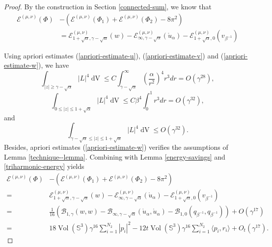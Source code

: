 \documentclass[11pt,letterpaper]{amsart}
\DeclareMathOperator{\Vol}{Vol}
\DeclareMathOperator{\dvol}{dV}
\newcommand{\mB}{\mathcal{B}}
\newcommand{\mE}{\mathcal{E}}
\newcommand{\bS}{\mathbb{S}}
\theoremstyle{definition}
\theoremstyle{remark}
\numberwithin{equation}{section}
\begin{document}
\begin{proof}
By the construction in Section \ref{connected-sum}, we know that
\begin{equation}
\begin{split}
    \mE^{(\mu,\nu)}(\Phi)&-\left(\mE^{(\mu,\nu)}(\Phi_1)+\mE^{(\mu,\nu)}(\Phi_2)-8\pi^2\right)\\
    &=\mE^{(\mu,\nu)}_{1+\sqrt{\alpha},\gamma-\sqrt{\alpha}}(w)-\mE^{(\mu,\nu)}_{\infty,\gamma-\sqrt{\alpha}}(\mathring{u}_{\alpha})-\mE^{(\mu,\nu)}_{1+\sqrt{\alpha},0}(v_{\beta^{-1}})
    \end{split}
\end{equation}

Using apriori estimates (\ref{apriori-estimate-u}), (\ref{apriori-estimate-v}) and (\ref{apriori-estimate-w}), we have
    \begin{equation}
    \int_{|z|\geq \gamma-\sqrt{\alpha}} |L|^4\dvol\leq C\int_{\gamma-\sqrt{\alpha}}^{\infty}\left(\frac{\alpha}{r^2}\right)^4 r^3dr=O(\gamma^{28}),
\end{equation}
\begin{equation}
    \int_{0\leq|z|\leq 1+\sqrt{\alpha}} |L|^4\dvol\leq C\beta^4\int_{0}^{1} r^3dr= O(\gamma^{32}),
\end{equation}
and 
\begin{equation}
    \int_{\gamma-\sqrt{\alpha}\leq|z|\leq 1+\sqrt{\alpha}}|L|^4\dvol\leq O(\gamma^{32}).
\end{equation}
Besides, apriori estimates (\ref{apriori-estimate-w}) verifies the assumptions of Lemma \ref{technique--lemma}. Combining with Lemma \ref{energy-savings} and \ref{triharmonic-energy} yields
\begin{equation*}
    \begin{split}
    \mE^{(\mu,\nu)}(\Phi)&-\left(\mE^{(\mu,\nu)}(\Phi_1)+\mE^{(\mu,\nu)}(\Phi_2)-8\pi^2\right)\\
    =&\mE^{(\mu,\nu)}_{1+\sqrt{\alpha},\gamma-\sqrt{\alpha}}(w)-\mE^{(\mu,\nu)}_{\infty,\gamma-\sqrt{\alpha}}(\mathring{u}_{\alpha})-\mE^{(\mu,\nu)}_{1+\sqrt{\alpha},0}(v_{\beta^{-1}})\\
    =&\frac{1}{16}\left(\mB_{1, \gamma}(w,w)-\mB_{\infty, \gamma-\sqrt{\alpha}}(\mathring{u}_{\alpha},\mathring{u}_{\alpha})-\mB_{1, 0}(q_{\beta^{-1}},q_{\beta^{-1}})\right)+O(\gamma^{17})\\
    =&18\Vol(\bS^3) \gamma^{16}\sum_{i=1}^{N_2}|p_i|^2
            -12t\Vol(\bS^3)\gamma^{16}\sum_{i=1}^{N_2}\langle p_i, r_i\rangle + O_t(\gamma^{17}).
    \end{split}
\end{equation*}

\end{proof}
\end{document}
